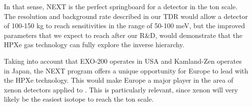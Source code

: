 In that sense, NEXT is the perfect springboard for a detector in the ton scale. The resolution and background rate described in our TDR would allow a detector of 100-150 kg to reach sensitivities in the range of 50-100 meV, but the improved parameters that we expect to reach after our R\&D, would demonstrate that the HPXe gas technology can fully explore the inverse hierarchy. 

Taking into account that EXO-200 operates in USA and Kamland-Zen operates in Japan, the NEXT program offers a unique opportunity for Europe to lead with the HPXe technology. This would make Europe a major player in the area of xenon detectors applied to \bbonu. This is particularly relevant, since xenon will very likely be the easiest isotope to reach the ton scale.
 
